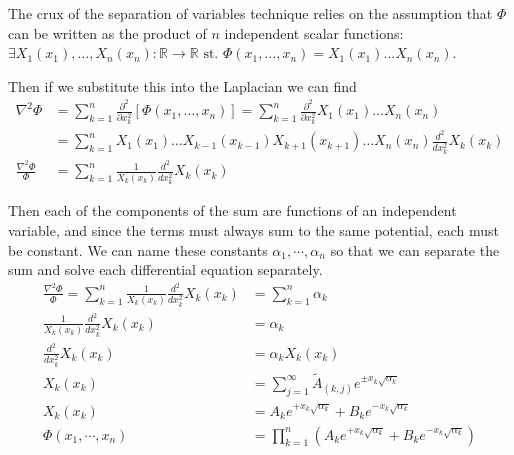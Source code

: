 \documentclass{article}	%
\theoremstyle{definition}
\begin{document}
The crux of the separation of variables technique relies on the assumption that $\Phi$ can be written as the product of $n$ independent scalar functions: $\exists X_{1}(x_{1}),\dots,X_{n}(x_{n}):\mathbb{R}\to\mathbb{R} \text{ st. } \Phi(x_{1},\dots,x_{n}) =  X_{1}(x_{1}) \dots X_{n}(x_{n})$.

Then if we substitute this into the Laplacian we can find
\begin{align*}
\nabla^{2}\Phi &= \sum_{k=1}^{n}\frac{\partial^{2}}{\partial x_{k}^{2}} \left[ \Phi(x_{1},\dots,x_{n}) \right] = \sum_{k=1}^{n}\frac{\partial^{2}}{\partial x_{k}^{2}} X_{1}(x_{1}) \dots X_{n}(x_{n})\\
&= \sum_{k=1}^{n} X_{1}(x_{1}) \dots X_{k-1}(x_{k-1}) X_{k+1}(x_{k+1}) \dots X_{n}(x_{n}) \frac{d^{2}}{dx_{k}^{2}} X_{k}(x_{k})\\
\frac{\nabla^{2}\Phi }{\Phi} &= \sum_{k=1}^{n} \frac{1}{X_{k}(x_{k})} \frac{d^{2}}{dx_{k}^{2}} X_{k}(x_{k})
\end{align*}

Then each of the components of the sum are functions of an independent variable, and since the terms must always sum to the same potential, each must be constant. We can name these constants $\alpha_{1},\cdots,\alpha_{n}$ so that we can separate the sum and solve each differential equation separately.
\begin{align*}
\frac{\nabla^{2}\Phi }{\Phi} = \sum_{k=1}^{n} \frac{1}{X_{k}(x_{k})} \frac{d^{2}}{dx_{k}^{2}} X_{k}(x_{k}) &= \sum_{k=1}^{n} \alpha_{k}\\
\frac{1}{X_{k}(x_{k})} \frac{d^{2}}{dx_{k}^{2}} X_{k}(x_{k}) &= \alpha_{k}\\
\frac{d^{2}}{dx_{k}^{2}} X_{k}(x_{k}) &= \alpha_{k}X_{k}(x_{k})\\
X_{k}(x_{k}) &= \sum_{j=1}^{\infty} \tilde{A}_{(k,j)}e^{\pm x_{k}\sqrt{\alpha_{k}}}\\
X_{k}(x_{k}) &= A_{k}e^{+x_{k}\sqrt{\alpha_{k}}} + B_{k}e^{-x_{k}\sqrt{\alpha_{k}}}\\
\Phi(x_{1},\cdots,x_{n}) &= \prod_{k=1}^{n} \left( A_{k}e^{+x_{k}\sqrt{\alpha_{k}}} + B_{k}e^{-x_{k}\sqrt{\alpha_{k}}} \right)
\end{align*}
\end{document}
